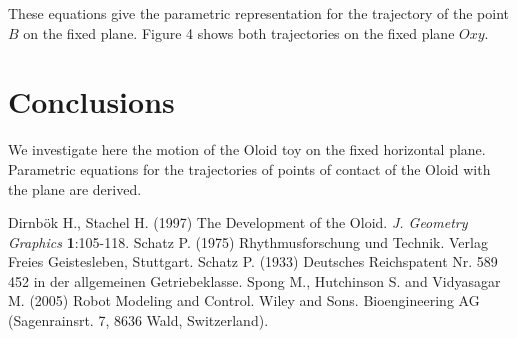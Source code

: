 \documentclass[10pt]{enoc2011}
\begin{document}
These equations give the parametric representation for the trajectory of the point $B$ on the fixed plane. Figure 4 shows both trajectories on the fixed plane $Oxy$.

\section{Conclusions}
We investigate here the motion of the Oloid toy on the fixed horizontal plane. Parametric equations for the trajectories of points of contact of the Oloid with the plane are derived.

\begin{thebibliography}{99}
 Dirnb\"ok H., Stachel H. (1997) The Development of the Oloid.  {\em J. Geometry Graphics}
{\bf 1}:105-118.
 Schatz P. (1975) Rhythmusforschung und Technik. Verlag Freies Geistesleben, Stuttgart.
 Schatz P. (1933) Deutsches Reichspatent Nr. 589 452 in der allgemeinen Getriebeklasse.
 Spong M., Hutchinson S. and Vidyasagar M. (2005) Robot Modeling and Control. Wiley and Sons.
 Bioengineering AG (Sagenrainsrt. 7, 8636 Wald, Switzerland).
\end{thebibliography}
\end{document}
